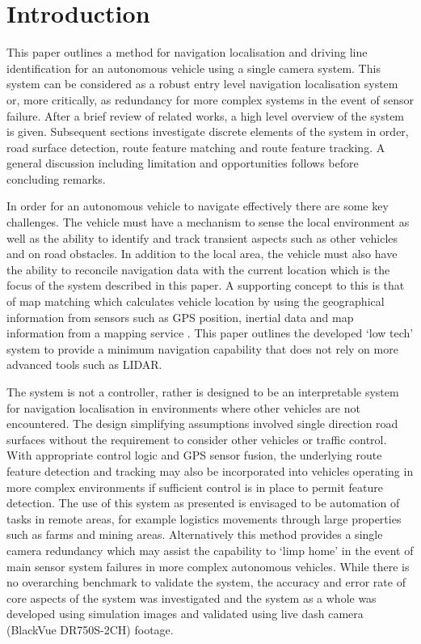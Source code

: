 \documentclass[]{aiaa-tc}%
\begin{document}

\newpage
\section{Introduction} \label{sect:intro}

This paper outlines a method for navigation localisation and driving line identification for an autonomous vehicle using a single camera system. This system can be considered as a robust entry level navigation localisation system or, more critically, as redundancy for more complex systems in the event of sensor failure. After a brief review of related works, a high level overview of the system is given. Subsequent sections investigate discrete elements of the system in order, road surface detection, route feature matching and route feature tracking. A general discussion including limitation and opportunities follows before concluding remarks.

In order for an autonomous vehicle to navigate effectively there are some key challenges. The vehicle must have a mechanism to sense the local environment as well as the ability to identify and track transient aspects such as other vehicles and on road obstacles. In addition to the local area, the vehicle must also have the ability to reconcile navigation data with the current location which is the focus of the system described in this paper. A supporting concept to this is that of map matching which calculates vehicle location by using the geographical information from sensors such as GPS position, inertial data and map information from a mapping service \citep{keyTechSelfDriving}. This paper outlines the developed `low tech' system to provide a minimum navigation capability that does not rely on more advanced tools such as LIDAR. 

The system is not a controller, rather is designed to be an interpretable system for navigation localisation in environments where other vehicles are not encountered. The design simplifying assumptions involved single direction road surfaces without the requirement to consider other vehicles or traffic control. With appropriate control logic and GPS sensor fusion, the underlying route feature detection and tracking may also be incorporated into vehicles operating in more complex environments if sufficient control is in place to permit feature detection. The use of this system as presented is envisaged to be automation of tasks in remote areas, for example logistics movements through large properties such as farms and mining areas. Alternatively this method provides a single camera redundancy which may assist the capability to `limp home' in the event of main sensor system failures in more complex autonomous vehicles. While there is no overarching benchmark to validate the system, the accuracy and error rate of core aspects of the system was investigated and the system as a whole was developed using simulation images and validated using live dash camera (BlackVue DR750S-2CH) footage.
\end{document}
